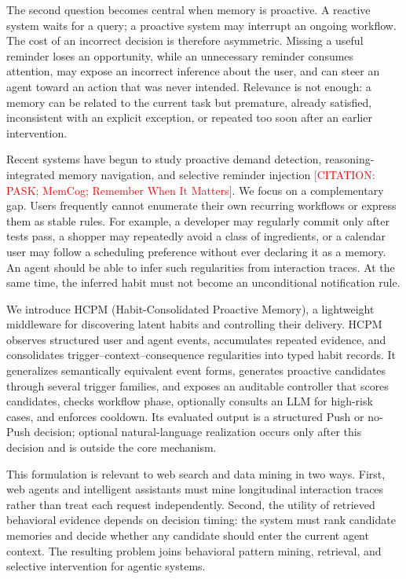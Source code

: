 \documentclass[sigconf,anonymous,review]{acmart}
\newcommand{\citetodo}[1]{\textcolor{red}{[CITATION: #1]}}
\newcommand{\system}{HCPM}
\begin{document}
The second question becomes central when memory is proactive.
A reactive system waits for a query; a proactive system may interrupt an ongoing workflow.
The cost of an incorrect decision is therefore asymmetric.
Missing a useful reminder loses an opportunity, while an unnecessary reminder consumes attention, may expose an incorrect inference about the user, and can steer an agent toward an action that was never intended.
Relevance is not enough: a memory can be related to the current task but premature, already satisfied, inconsistent with an explicit exception, or repeated too soon after an earlier intervention.

Recent systems have begun to study proactive demand detection, reasoning-integrated memory navigation, and selective reminder injection \citetodo{PASK; MemCog; Remember When It Matters}.
We focus on a complementary gap.
Users frequently cannot enumerate their own recurring workflows or express them as stable rules.
For example, a developer may regularly commit only after tests pass, a shopper may repeatedly avoid a class of ingredients, or a calendar user may follow a scheduling preference without ever declaring it as a memory.
An agent should be able to infer such regularities from interaction traces.
At the same time, the inferred habit must not become an unconditional notification rule.

We introduce \system{} (Habit-Consolidated Proactive Memory), a lightweight middleware for discovering latent habits and controlling their delivery.
\system{} observes structured user and agent events, accumulates repeated evidence, and consolidates trigger--context--consequence regularities into typed habit records.
It generalizes semantically equivalent event forms, generates proactive candidates through several trigger families, and exposes an auditable controller that scores candidates, checks workflow phase, optionally consults an LLM for high-risk cases, and enforces cooldown.
Its evaluated output is a structured Push or no-Push decision; optional natural-language realization occurs only after this decision and is outside the core mechanism.

This formulation is relevant to web search and data mining in two ways.
First, web agents and intelligent assistants must mine longitudinal interaction traces rather than treat each request independently.
Second, the utility of retrieved behavioral evidence depends on decision timing: the system must rank candidate memories and decide whether any candidate should enter the current agent context.
The resulting problem joins behavioral pattern mining, retrieval, and selective intervention for agentic systems.
\end{document}

